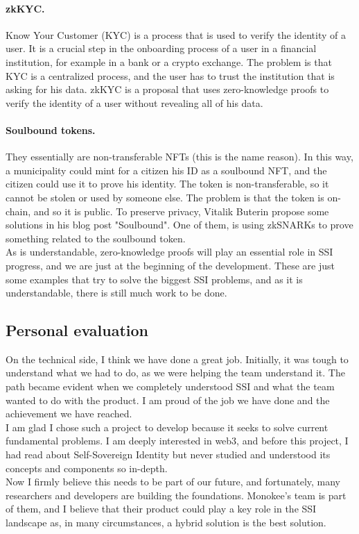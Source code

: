 \paragraph{zkKYC.} Know Your Customer (KYC) is a process that is used to verify the identity 
of a user. It is a crucial step in the onboarding process of a user in a financial 
institution, for example in a bank or a crypto exchange. The problem is that KYC is a 
centralized process, and the user has to trust the institution that is asking for his
data. zkKYC is a proposal that uses zero-knowledge proofs to verify the identity of a user
without revealing all of his data.

\paragraph{Soulbound tokens.} They essentially are non-transferable NFTs (this is the name 
reason). In this way, a municipality could mint for a citizen his ID as a soulbound NFT, 
and the citizen could use it to prove his identity. The token is non-transferable, so it 
cannot be stolen or used by someone else. The problem is that the token is on-chain, and 
so it is public. To preserve privacy, Vitalik Buterin propose some solutions in his blog 
post "Soulbound". One of them, is using zkSNARKs to prove something related to the 
soulbound token.
\vspace{0.3cm}\\
As is understandable, zero-knowledge proofs will play an essential role in SSI progress, 
and we are just at the beginning of the development. These are just some examples that try to solve the 
biggest SSI problems, and as it is understandable, there is still much work to be done.

\subsection{Personal evaluation}
On the technical side, I think we have done a great job. Initially, it was tough to 
understand what we had to do, as we were helping the team understand it. The path became 
evident when we completely understood SSI and what the team wanted to do with the product.
I am proud of the job we have done and the achievement we have reached.\\
I am glad I chose such a project to develop because it seeks to solve current fundamental
problems. I am deeply interested in web3, and before this project, I had read about 
Self-Sovereign Identity but never studied and understood its concepts and components so 
in-depth.\\
Now I firmly believe this needs to be part of our future, and fortunately, many researchers 
and developers are building the foundations. Monokee's team is part of them, and I believe 
that their product could play a key role in the SSI landscape as, in many circumstances, 
a hybrid solution is the best solution.\\